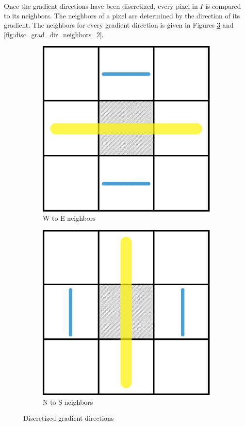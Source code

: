 Once the gradient directions have been discretized, every pixel in
$I$ is compared to its neighbors. The neighbors of a pixel are determined
by the direction of its gradient. The neighbors for every gradient
direction is given in Figures \ref{fig:disc_grad_dir_neighbors_1}
and \ref{fig:disc_grad_dir_neighbors_2}. 

\begin{figure}[h!]
\centering
\begin{subfigure}{.5\textwidth}
  \centering
  \includegraphics[width=.4\linewidth]{Graphics/disc_grad_dir_neighb_horizontal.png}
  \caption{W to E neighbors}
  \label{fig:disc_grad_dir_horiz}
\end{subfigure}%
\begin{subfigure}{.5\textwidth}
  \centering
  \includegraphics[width=.4\linewidth]{Graphics/disc_grad_dir_neighb_vertical.png}
  \caption{N to S neighbors}
  \label{fig:disc_grad_dir_vert}
\end{subfigure}
\caption{Discretized gradient directions}
\label{fig:disc_grad_dir_neighbors_1}
\end{figure}

